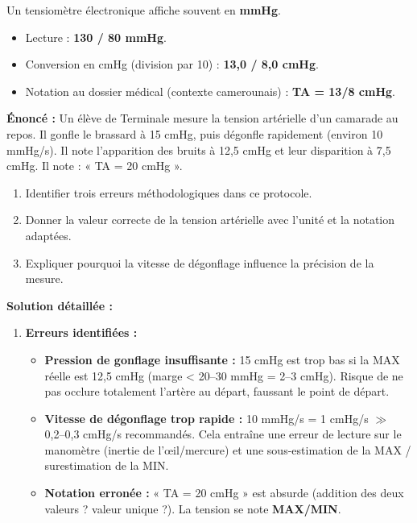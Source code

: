 \documentclass[11pt]{article}
\begin{document}
\begin{exemplebox}
Un tensiomètre électronique affiche souvent en \textbf{mmHg}.
\begin{itemize}
    \item Lecture : \textbf{130 / 80 mmHg}.
    \item Conversion en cmHg (division par 10) : \textbf{13,0 / 8,0 cmHg}.
    \item Notation au dossier médical (contexte camerounais) : \textbf{TA = 13/8 cmHg}.
\end{itemize}
\end{exemplebox}

\begin{exoresolu}
\textbf{Énoncé :} Un élève de Terminale mesure la tension artérielle d'un camarade au repos. Il gonfle le brassard à 15 cmHg, puis dégonfle rapidement (environ 10 mmHg/s). Il note l'apparition des bruits à 12,5 cmHg et leur disparition à 7,5 cmHg. Il note : « TA = 20 cmHg ».
\begin{enumerate}
    \item Identifier trois erreurs méthodologiques dans ce protocole.
    \item Donner la valeur correcte de la tension artérielle avec l'unité et la notation adaptées.
    \item Expliquer pourquoi la vitesse de dégonflage influence la précision de la mesure.
\end{enumerate}
\tcblower
\textbf{Solution détaillée :}
\begin{enumerate}
    \item \textbf{Erreurs identifiées :}
    \begin{itemize}
        \item \textbf{Pression de gonflage insuffisante :} 15 cmHg est trop bas si la MAX réelle est 12,5 cmHg (marge < 20--30 mmHg = 2--3 cmHg). Risque de ne pas occlure totalement l'artère au départ, faussant le point de départ.
        \item \textbf{Vitesse de dégonflage trop rapide :} 10 mmHg/s = 1 cmHg/s $\gg$ 0,2--0,3 cmHg/s recommandés. Cela entraîne une erreur de lecture sur le manomètre (inertie de l'œil/mercure) et une sous-estimation de la MAX / surestimation de la MIN.
        \item \textbf{Notation erronée :} « TA = 20 cmHg » est absurde (addition des deux valeurs ? valeur unique ?). La tension se note \textbf{MAX/MIN}.
    \end{itemize}

\end{enumerate}
\end{exoresolu}
\end{document}
